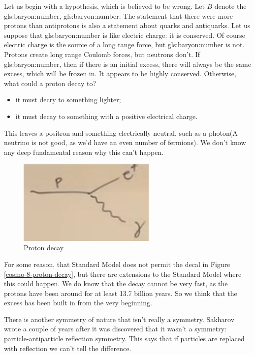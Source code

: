 \documentclass[]{article}
\begin{document}
Let us begin with a hypothesis, which is believed to be wrong. Let $B$ denote the \gls{gls:baryon:number}, \glsdesc{gls:baryon:number}. The statement that there were more protons than antiprotons is also a statement about quarks and antiquarks.
Let us suppose that \gls{gls:baryon:number} is like electric charge: it is conserved. Of course electric charge is the source of a long range force, but \gls{gls:baryon:number} is not. Protons create long range Coulomb forces, but neutrons don't. If \gls{gls:baryon:number}, then if there is an initial excess, there will always be the same excess, which will be frozen in. It appears to be highly conserved. Otherwise, what could a proton decay to?
\begin{itemize}
	\item it must decry to something lighter;
	\item it must decay to something with a positive electrical charge.
\end{itemize}
This leaves a positron and something electrically neutral, such as a photon(A neutrino is not good, as we'd have an even number of fermions). We don't know any deep fundamental reason why this can't happen.
\begin{figure}[H]
	\caption{Proton decay}\label{fig:cosmo-8-proton-decay}
	\begin{center}
		\includegraphics[width=0.6\textwidth]{cosmo-8-proton-decay}
	\end{center}
\end{figure}
For some reason, that Standard Model does not permit the decal in Figure \ref{cosmo-8-proton-decay}, but there are extensions to the Standard Model where this could happen. We do know that the decay cannot be very fast, as the protons have been around for at least 13.7 billion years. So we think that the excess has been built in from the very beginning.

There is another symmetry of nature that isn't really a symmetry. Sakharov wrote a couple of years after it was discovered that it wasn't a symmetry: particle-antiparticle reflection symmetry. This says that if particles are replaced with reflection we can't tell the difference.
\end{document}
